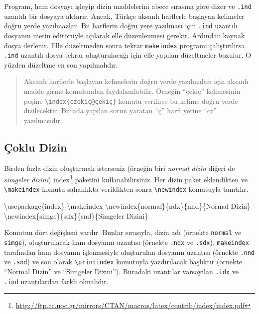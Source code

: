 \documentclass[
  10pt,
]{scrbook}
\newenvironment{Shaded}{\begin{snugshade}}{\end{snugshade}}
\newcommand{\BuiltInTok}[1]{#1}
\newcommand{\ExtensionTok}[1]{#1}
\newcommand{\FunctionTok}[1]{\textcolor[rgb]{0.00,0.00,0.00}{#1}}
\newcommand{\NormalTok}[1]{#1}
\renewcommand{\href}[2]{#2\footnote{\url{#1}}}
\theoremstyle{definition}
\theoremstyle{definition}
\theoremstyle{definition}
\theoremstyle{definition}
\theoremstyle{remark}
\begin{document}
Program, ham dosyayı işleyip dizin maddelerini abece sırasına göre dizer ve \texttt{.ind} uzantılı bir dosyaya aktarır. Ancak, Türkçe aksanlı harflerle başlayan kelimeler doğru yerde yazılmazlar. Bu harflerin doğru yere yazılması için \texttt{.ind} uzantılı dosyanın metin editörüyle açılarak elle düzenlenmesi gerekir. Ardından kaynak dosya derlenir. Elle düzeltmeden sonra tekrar \texttt{makeindex} programı çalıştırılırsa \texttt{.ind} uzantılı dosya tekrar oluşturulacağı için elle yapılan düzeltmeler bozulur. O yüzden düzeltme en son yapılmalıdır.

\begin{quote}
Aksanlı harflerle başlayan kelimelerin doğru yerde yazılmaları için aksanlı madde girme komutundan faydalanılabilir. Örneğin ``çekiç'' kelimesinin peşine \texttt{\textbackslash{}index\{czekiç@çekiç\}} komutu verilirse bu kelime doğru yerde dizilecektir. Burada yapılan sorun yaratan ``ç'' harfi yerine ``cz'' yazılmasıdır.
\end{quote}

\hypertarget{uxe7oklu-dizin}{%
\subsection{Çoklu Dizin}\label{uxe7oklu-dizin}}

Birden fazla dizin oluşturmak isterseniz (örneğin biri \emph{normal dizin} diğeri de \emph{simgeler dizini}) \href{http://ftp.cc.uoc.gr/mirrors/CTAN/macros/latex/contrib/index/index.pdf}{index} paketini kullanabilirsiniz. Her dizin paket eklendikten ve \texttt{\textbackslash{}makeindex} komutu sahanlıkta verildikten sonra \texttt{\textbackslash{}newindex} komutuyla tanıtılır.

\begin{Shaded}
\begin{Highlighting}[]
\BuiltInTok{\textbackslash{}usepackage}\NormalTok{\{}\ExtensionTok{index}\NormalTok{\}}
\FunctionTok{\textbackslash{}makeindex}
\FunctionTok{\textbackslash{}newindex}\NormalTok{\{normal\}\{ndx\}\{nnd\}\{Normal Dizin\}}
\FunctionTok{\textbackslash{}newindex}\NormalTok{\{simge\}\{sdx\}\{snd\}\{Simgeler Dizini\}}
\end{Highlighting}
\end{Shaded}

Komutun dört değişkeni vardır. Bunlar sırasıyla, dizin adı (örnekte \texttt{normal} ve \texttt{simge}), oluşturulacak ham dosyanın uzantısı (örnekte \texttt{.ndx} ve \texttt{.sdx}), \texttt{makeindex} tarafından ham dosyanın işlenmesiyle oluşturulan dosyanın uzantısı (örnekte \texttt{.nnd} ve \texttt{.snd}) ve son olarak \texttt{\textbackslash{}printindex} komutuyla yazdırılacak başlıktır (örnekte ``Normal Dizin'' ve ``Simgeler Dizini''). Buradaki uzantılar varsayılan \texttt{.idx} ve \texttt{.ind} uzantılardan farklı olmalıdır.
\end{document}

